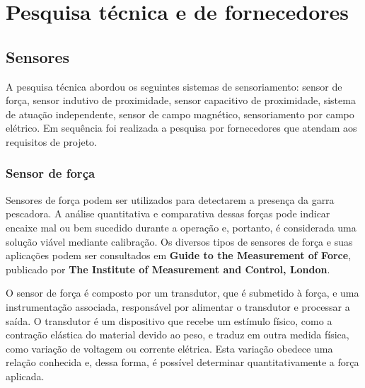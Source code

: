 

\setcounter{secnumdepth}{3}
\section{Pesquisa técnica e de fornecedores}

\subsection{Sensores}
A pesquisa técnica abordou os seguintes sistemas de sensoriamento: sensor de força, sensor indutivo de proximidade,
 sensor capacitivo de proximidade, sistema de atuação independente, sensor de
 campo magnético, sensoriamento por campo elétrico. Em sequência foi realizada a
 pesquisa por fornecedores que atendam aos requisitos de projeto.
 
\subsubsection{Sensor de força}

 Sensores de força podem ser utilizados para detectarem a presença da garra pescadora. A análise quantitativa e comparativa dessas forças pode indicar encaixe mal ou bem sucedido durante a operação e, portanto, é considerada uma solução viável mediante calibração. Os diversos tipos de sensores de força e suas aplicações podem ser consultados em \textbf{Guide to the Measurement of Force}, publicado por \textbf{The Institute of Measurement and Control, London}.

 O sensor de força é composto por um transdutor, que é submetido à força, e uma instrumentação associada, responsável por alimentar o transdutor e processar a saída. O transdutor é um dispositivo que recebe um estímulo físico, como a contração elástica do material devido ao peso, e traduz em outra medida física, como variação de voltagem ou corrente elétrica. Esta variação obedece uma relação conhecida e, dessa forma, é possível determinar quantitativamente a força aplicada.

